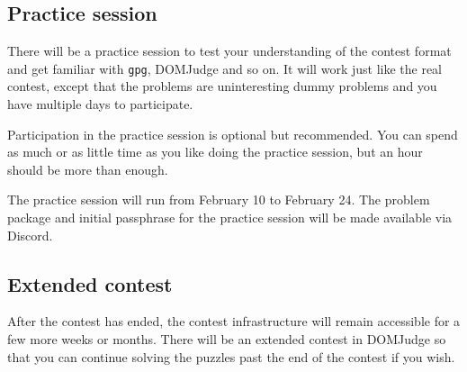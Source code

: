 \documentclass[fontsize=10pt,a4paper,DIV=12,parskip=half]{scrarticle}
\begin{document}
\subsection*{Practice session}
There will be a practice session to test your understanding of the contest format and
get familiar with \texttt{gpg}, DOMJudge and so on. It will work just like the real
contest, except that the problems are uninteresting dummy problems and you have
multiple days to participate.

Participation in the practice session is optional but recommended.
You can spend as much or as little time as you like
doing the practice session, but an hour should be more than enough.

The practice session will run
from February 10 to February 24. The problem package and initial passphrase for the practice session
will be made available via Discord.

\subsection*{Extended contest}
After the contest has ended, the contest infrastructure will remain accessible for
a few more weeks or months. There will be an extended contest in DOMJudge so that you can
continue solving the puzzles past the end of the contest if you wish.
\end{document}
